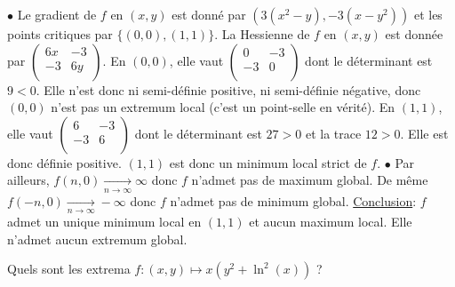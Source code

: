 \documentclass{fancybook}
\begin{document}
$\bullet$ Le gradient de $f$ en $(x,y)$ est donné par $\left(3 \left(x^2-y\right),-3 \left(x-y^2\right)\right)$ et les points critiques par $\{(0,0),(1,1)\}$.\newline
La Hessienne de $f$ en $(x,y)$ est donnée par $\left(
\begin{array}{cc}
 6 x & -3 \\
 -3 & 6 y \\
\end{array}
\right)$.\newline
En $(0,0)$, elle vaut $\left(
\begin{array}{cc}
 0 & -3 \\
 -3 & 0 \\
\end{array}
\right)$ dont le déterminant est $9<0$. Elle n'est donc ni semi-définie positive, ni semi-définie négative, donc $(0,0)$ n'est pas un extremum local (c'est un point-selle en vérité).\newline
En $(1,1)$, elle vaut $\left(
\begin{array}{cc}
 6 & -3 \\
 -3 & 6 \\
\end{array}
\right)$ dont le déterminant est $27>0$ et la trace $12>0$. Elle est donc définie positive. $(1,1)$ est donc un minimum local strict de $f$. \newline
$\bullet$ Par ailleurs, $f(n,0)\xrightarrow[n\to \infty]{}\infty$ donc $f$ n'admet pas de maximum global. \newline
De même $f(-n,0)\xrightarrow[n\to \infty]{}-\infty$ donc $f$ n'admet pas de minimum global.
\newline
\newline
\underline{Conclusion}: $f$ admet un unique minimum local en $(1,1)$ et aucun maximum local. Elle n'admet aucun extremum global.

\begin{exercice}
Quels sont les extrema $\displaystyle f:(x,y)\mapsto x(y^2+\ln^2(x))$ ?
\end{exercice}
\end{document}

